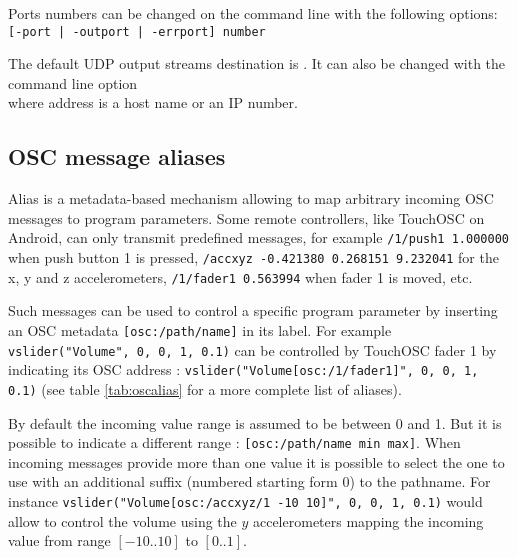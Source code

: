 Ports numbers can be changed on the command line with the following options: \\
\hspace*{6mm}\lstinline'[-port | -outport | -errport] number'

The default UDP output streams destination is . It can also be changed with the command line option \\
\hspace*{6mm} where address is a host name or an IP number.

\subsection{OSC message aliases}
\label{sec:oscaudio}
Alias is a metadata-based mechanism allowing to map arbitrary incoming OSC messages to program parameters. 
Some remote controllers, like TouchOSC on Android, can only transmit predefined messages, for example \lstinline'/1/push1 1.000000' when push button 1 is pressed, \lstinline'/accxyz -0.421380 0.268151 9.232041' for the x, y and z accelerometers, \lstinline'/1/fader1 0.563994' when fader 1 is moved, etc. 

Such messages can be used to control a specific program parameter by inserting an OSC metadata \lstinline'[osc:/path/name]' in its label. For example \lstinline'vslider("Volume", 0, 0, 1, 0.1)' can be controlled by TouchOSC fader 1 by indicating its OSC address : \lstinline'vslider("Volume[osc:/1/fader1]", 0, 0, 1, 0.1)' (see table \ref{tab:oscalias} for a more complete list of aliases).  

By default the incoming value range is assumed to be between 0 and 1. But it is possible to indicate a different range : \lstinline'[osc:/path/name min max]'. When incoming messages provide more than one value it is possible to select the one to use with an additional suffix (numbered starting form 0) to the pathname.  For instance \lstinline'vslider("Volume[osc:/accxyz/1 -10 10]", 0, 0, 1, 0.1)' would allow to control the volume using the $y$ accelerometers mapping the incoming value from range $[-10..10]$ to $[0..1]$.



